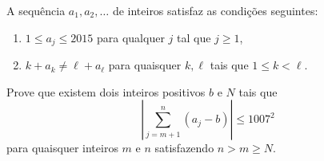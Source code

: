 A sequência $a_1,a_2,\dots$ de inteiros satisfaz as condições seguintes:

\begin{enumerate}[label = (\roman*)]
	\item $1 \le a_j \le 2015$ para qualquer $j$ tal que $j\ge1$, 
	\item $k+a_k\neq \ell+a_\ell$ para quaisquer $k, \ell$ tais que  $1\le k<\ell$.
\end{enumerate}

Prove que existem dois inteiros positivos $b$ e $N$ tais que 
\[\left\vert\sum_{j=m+1}^n(a_j-b)\right\vert\le1007^2\]
para quaisquer inteiros $m$ e $n$ satisfazendo $n > m \ge N$. 
